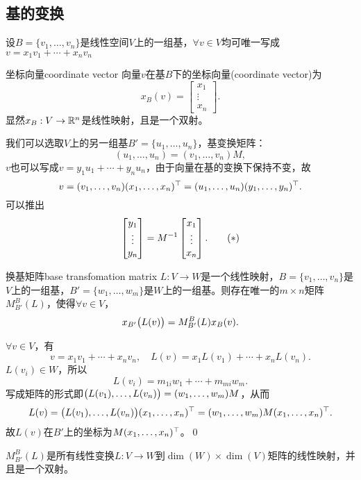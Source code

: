 \subsection{基的变换}
设$B=\{v_1,\ldots,v_n\}$是线性空间$V$上的一组基，$\forall v\in V$均可唯一写成$v=x_1v_1+\cdots+x_nv_n$
\begin{definition}{坐标向量}{coordinate vector}
	向量$v$在基$B$下的坐标向量(coordinate vector)为
	\[
		x_B(v)=\begin{bmatrix}
			x_1\\\vdots\\x_n
		\end{bmatrix}.
	\]
	显然$x_B:V\to\mathbb R^n$是线性映射，且是一个双射。
\end{definition}
我们可以选取$V$上的另一组基$B'=\{u_1,\ldots,u_n\}$，基变换矩阵：
\[
	(u_1,\ldots,u_n)=(v_1,\ldots,v_n)M,\tag{$\ast$}
\]
$v$也可以写成$v=y_1u_1+\cdots+y_nu_n$，由于向量在基的变换下保持不变，故
\[
	v=(v_1,\ldots,v_n)(x_1,\ldots,x_n)^\top=(u_1,\ldots,u_n)(y_1,\ldots,y_n)^\top.
\]
可以推出
\[
	\begin{bmatrix}
		y_1\\\vdots\\y_n
	\end{bmatrix}=M^{-1}\begin{bmatrix}
		x_1\\\vdots\\x_n
	\end{bmatrix}.\tag{$\ast$}
\]
\begin{theorem}{换基矩阵}{base transfomation matrix}
	$L:V\to W$是一个线性映射，$B=\{v_1,\ldots,v_n\}$是$V$上的一组基，$B'=\{w_1,\ldots,w_m\}$是$W$上的一组基。则存在唯一的$m\times n$矩阵$M_{B'}^B(L)$，使得$\forall v\in V$，
	\[
		x_{B'}\bigl(L(v)\bigr)=M_{B'}^B(L)x_B(v).
	\]
\end{theorem}
\prf $\forall v\in V$，有
\[
	v=x_1v_1+\cdots+x_nv_n,\quad L(v)=x_1L(v_1)+\cdots+x_nL(v_n).
\]
$L(v_i)\in W$，所以
\[
	L(v_i)=m_{1i}w_1+\cdots+m_{mi}w_m.
\]
写成矩阵的形式即$\bigl(L(v_1),\ldots,L(v_n)\bigr)=(w_1,\ldots,w_m)M$，从而
\[
	L(v)=\bigl(L(v_1),\ldots,L(v_n)\bigr)(x_1,\ldots,x_n)^\top=(w_1,\ldots,w_m)M(x_1,\ldots,x_n)^\top.
\]
故$L(v)$在$B'$上的坐标为$M(x_1,\ldots,x_n)^\top$。\qed

$M_{B'}^B(L)$是所有线性变换$L:V\to W$到$\dim(W)\times\dim(V)$矩阵的线性映射，并且是一个双射。

